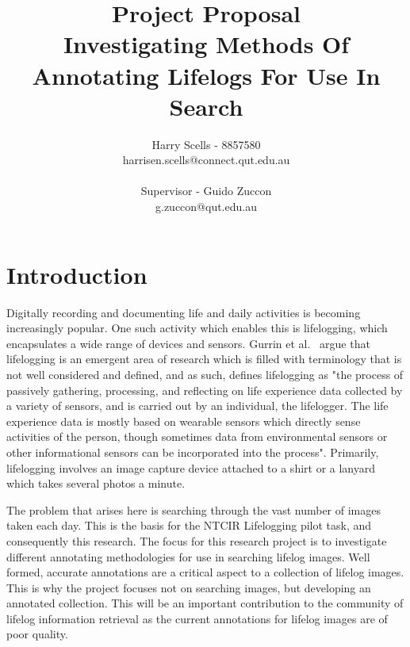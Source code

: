 \documentclass[12pt,a4paper]{article}
\begin{document}
\title{\small Project Proposal\\\huge Investigating Methods Of Annotating Lifelogs For Use In Search}

\author{Harry Scells - 8857580\\harrisen.scells@connect.qut.edu.au\\\\\small Supervisor - Guido Zuccon\\\small g.zuccon@qut.edu.au\\}
\maketitle
\pagebreak
\tableofcontents
\pagebreak

\section{Introduction}
Digitally recording and documenting life and daily activities is becoming increasingly popular. One such activity which enables this is lifelogging, which encapsulates a wide range of devices and sensors. Gurrin et al.~\cite{gurrin2014lifelogging} argue that lifelogging is an emergent area of research which is filled with terminology that is not well considered and defined, and as such, defines lifelogging as "the process of passively gathering, processing, and reflecting on life experience data collected by a variety of sensors, and is carried out by an individual, the lifelogger. The life experience data is mostly based on wearable sensors which directly sense activities of the person, though sometimes data from environmental sensors or other informational sensors can be incorporated into the process". Primarily, lifelogging involves an image capture device attached to a shirt or a lanyard which takes several photos a minute.

The problem that arises here is searching through the vast number of images taken each day. This is the basis for the NTCIR Lifelogging pilot task, and consequently this research. The focus for this research project is to investigate different annotating methodologies for use in searching lifelog images. Well formed, accurate annotations are a critical aspect to a collection of lifelog images. This is why the project focuses not on searching images, but developing an annotated collection. This will be an important contribution to the community of lifelog information retrieval as the current annotations for lifelog images are of poor quality.
\end{document}
